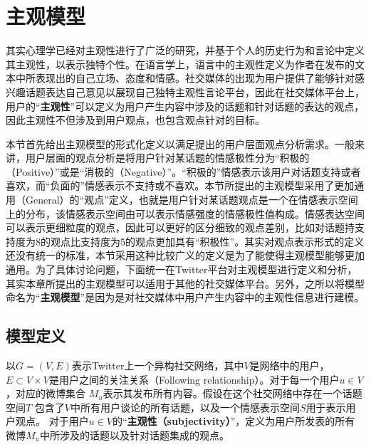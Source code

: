 \section{主观模型}
\label{sec4}
其实心理学已经对主观性进行了广泛的研究，并基于个人的历史行为和言论中定义其主观性，以表示独特个性。在语言学上，语言中的主观性定义为作者在发布的文本中所表现出的自己立场、态度和情感。社交媒体的出现为用户提供了能够针对感兴趣话题表达自己意见以展现自己独特主观性言论平台，因此在社交媒体平台上，用户的“\textbf{主观性}”可以定义为用户产生内容中涉及的话题和针对话题的表达的观点，因此主观性不但涉及到用户观点，也包含观点针对的目标。

本节首先给出主观模型的形式化定义以满足提出的用户层面观点分析需求。一般来讲，用户层面的观点分析是将用户针对某话题的情感极性分为“积极的（Positive）”或是“消极的（Negative）”。“积极的”情感表示该用户对话题支持或者喜欢，而“负面的”情感表示不支持或不喜欢。本节所提出的主观模型采用了更加通用（General）的“观点”定义，也就是用户针对某话题观点是一个在情感表示空间上的分布，该情感表示空间由可以表示情感强度的情感极性值构成。情感表达空间可以表示更细粒度的观点，因此可以更好的区分细致的观点差别，比如对话题持支持度为8的观点比支持度为5的观点更加具有“积极性”。其实对观点表示形式的定义还没有统一的标准，本节采用这种比较广义的定义是为了能使得主观模型能够更加通用。为了具体讨论问题，下面统一在Twitter平台对主观模型进行定义和分析，其实本章所提出的主观模型可以适用于其他的社交媒体平台。另外，之所以将模型命名为“\textbf{主观模型}”是因为是对社交媒体中用户产生内容中的主观性信息进行建模。

\subsection{模型定义}
\label{definition}
以$G=\left( V,E \right) $表示Twitter上一个异构社交网络，其中$ V $是网络中的用户，$ E\subset V\times V $是用户之间的关注关系（Following relationship）。对于每一个用户$ u \in V $，对应的微博集合 $ M_{u} $表示其发布所有内容。假设在这个社交网络中存在一个话题空间$ T $ 包含了$ V $中所有用户谈论的所有话题，以及一个情感表示空间$ S $用于表示用户观点。
对于用户$ u  \in V $的“\textbf{主观性（subjectivity）}”，定义为用户所发表的所有微博$ M_{u} $中所涉及的话题以及针对话题集成的观点。
  
